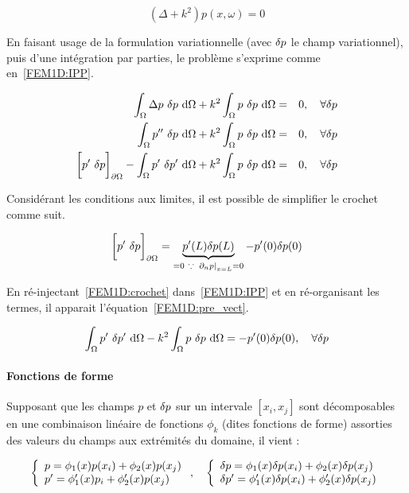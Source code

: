 \begin{equation}
	(\Delta + k^2)p(x,\omega) = 0 \label{FEM1D:helm}
\end{equation}

En faisant usage de la formulation variationnelle (avec $\delta p$ le champ variationnel), puis d'une intégration par
parties, le problème s'exprime comme en~\eqref{FEM1D:IPP}.

\begin{eqnarray}
	\int_\Omega \Delta p~\delta p~\mathrm{d}\Omega + k^2 \int_\Omega p~\delta p~\mathrm{d}\Omega & =  & 0,\quad \forall\delta p\notag\\
	\int_\Omega p''~\delta p~\mathrm{d}\Omega + k^2 \int_\Omega p~\delta p~\mathrm{d}\Omega & =  & 0,\quad \forall\delta p\notag\\
	\bigg[p'~\delta p\bigg]_{\partial\Omega} - \int_\Omega p'~\delta p' ~\mathrm{d}\Omega + k^2\int_\Omega p~\delta p~\mathrm{d}\Omega & = & 0, \quad \forall\delta p \label{FEM1D:IPP}
\end{eqnarray}

Considérant les conditions aux limites, il est possible de simplifier le crochet comme suit.

\begin{equation}
	\bigg[p'~\delta p\bigg]_{\partial\Omega} = \underbrace{p'(L)\delta p(L)}_{=0~\because~\left.\partial_np\right|_{x=L}= 0} - p'(0)\delta p(0) \label{FEM1D:crochet}\\
\end{equation}

En ré-injectant~\eqref{FEM1D:crochet} dans~\eqref{FEM1D:IPP} et en ré-organisant les termes, il apparait l'équation~\ref{FEM1D:pre_vect}.

\begin{equation}
	\int_\Omega p'~\delta p'~\mathrm{d}\Omega - k^2\int_\Omega p~\delta p~\mathrm{d}\Omega = -p'(0)\delta p(0), \quad \forall\delta p \label{FEM1D:post_IPP}
\end{equation}

\paragraph{Fonctions de forme}

Supposant que les champs $p$ et $\delta p$ sur un intervale $[x_i, x_j]$ sont décomposables en une combinaison linéaire de
fonctions $\phi_k$ (dites fonctions de forme) assorties des valeurs du champs aux extrémités du domaine, il vient :

\begin{equation}
	\left\{\begin{array}{l}
		p = \phi_1(x)p(x_i) + \phi_2(x)p(x_j)\\
		p' = \phi_1'(x)p_i + \phi_2'(x)p(x_j)\\
	\end{array}\right., \quad
	\left\{\begin{array}{l}
		\delta p = \phi_1(x)\delta p(x_i) + \phi_2(x)\delta p(x_j)\\
		\delta p' = \phi_1'(x)\delta p(x_i) + \phi_2'(x)\delta p(x_j)\\
	\end{array}\right.\label{FEM1D:shapefun}
\end{equation}


